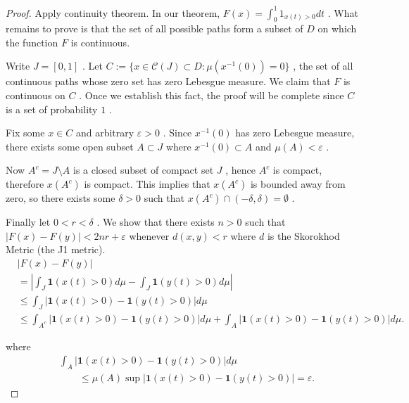 \begin{proof}
	

Apply continuity theorem. In our theorem, $F(x) = \int_0^1 1_{x(t) > 0} dt$ .  
What remains to prove is that
		  the set of all possible paths form a subset of $D$ on which the function $F$ is continuous.  

		Write $J = [0,1]$ . Let $C:= \{x \in \mathcal{C}(J) \subset D: \mu(x^{-1}(0)) = 0\}$ , the set of all continuous paths whose zero set has zero Lebesgue measure. We claim that $F$ is continuous on $C$ . Once we establish this fact, the proof will be complete since $C$ is a set of probability $1$ .  

		Fix some $x \in C$ and arbitrary $\varepsilon >0$ . Since $x^{-1}(0)$ has zero Lebesgue measure, there exists some open subset $A \subset J$ where $x^{-1}(0)\subset A$ and $\mu(A) < \varepsilon$ .  

		Now $A^c = J \setminus A$ is a closed subset of compact set $J$ , hence $A^c$ is compact, therefore $x(A^c)$ is compact. This implies that $x(A^c)$ is bounded away from zero, so there exists some $\delta>0$ such that $x(A^c) \cap (-\delta, \delta) = \emptyset$ .  

		 Finally let $0<r<\delta$ . We show that there exists $n>0$ such that $|F(x) - F(y)| < 2 n r+\varepsilon$ whenever $d(x, y)< r$ where $d$ is the Skorokhod Metric (the J1 metric).  
		  \begin{align*}
		  &\left| F(x) - F(y) \right| \\
		  	&= \left| \int _J \mathbf{1}\left( x(t)  >0 \right) d\mu - \int _J \mathbf{1}\left( y(t) >0 \right) d\mu \right| \\
		  	&\le \int_{J} \left| \mathbf{1}\left( x(t) > 0 \right)  - \mathbf{1}\left( y(t) > 0 \right)  \right| d\mu \\
		  	&\le \int_{A^c} \left| \mathbf{1}\left( x(t) > 0 \right)  - \mathbf{1}\left( y(t) > 0 \right)  \right| d\mu 
		  	+ \int_{A} \left| \mathbf{1}\left( x(t) > 0 \right)  - \mathbf{1}\left( y(t) > 0 \right)  \right| d\mu 
		  .
		  \end{align*}
		    
		where  
		  \begin{align*}
		  &\int_{A} \left| \mathbf{1}\left( x(t) > 0 \right)  - \mathbf{1}\left( y(t) > 0 \right)  \right| d\mu \\
		  	&\qquad \le \mu(A) \operatorname{sup}  \left| \mathbf{1}\left( x(t) > 0 \right)  - \mathbf{1}\left( y(t) > 0 \right)  \right| = \varepsilon
		  .
		  \end{align*}
		    

\end{proof}
